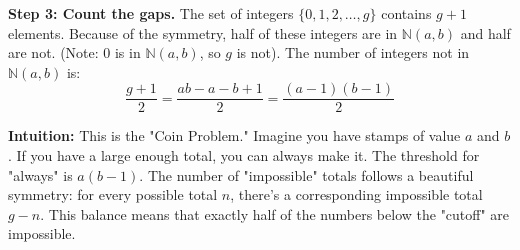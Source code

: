 \begin{solution}
\textbf{Step 3: Count the gaps.}
The set of integers $\{0, 1, 2, \dots, g\}$ contains $g+1$ elements.
Because of the symmetry, half of these integers are in $\mathbb{N}(a, b)$ and half are not.
(Note: $0$ is in $\mathbb{N}(a, b)$, so $g$ is not).
The number of integers not in $\mathbb{N}(a, b)$ is:
\[ \frac{g+1}{2} = \frac{ab - a - b + 1}{2} = \frac{(a-1)(b-1)}{2} \]

\textbf{Intuition:}
This is the "Coin Problem." Imagine you have stamps of value $a$ and $b$. If you have a large enough total, you can always make it. The threshold for "always" is $a(b-1)$. The number of "impossible" totals follows a beautiful symmetry: for every possible total $n$, there's a corresponding impossible total $g-n$. This balance means that exactly half of the numbers below the "cutoff" are impossible.
\end{solution}
